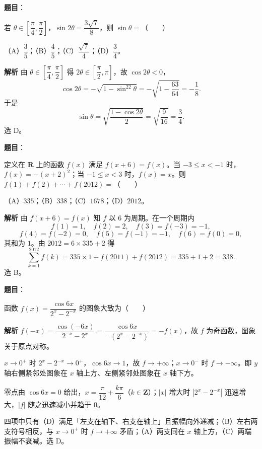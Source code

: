 \begin{answer}

\textbf{题目}：

若 $\theta\in\left[\dfrac\pi4,\dfrac\pi2\right]$，$\sin2\theta=\dfrac{3\sqrt7}8$，则 $\sin\theta=$\mbox{（　　）}

（A）$\dfrac35$；（B）$\dfrac45$；（C）$\dfrac{\sqrt7}4$；（D）$\dfrac34$。

\textbf{解析}
由 $\theta\in\left[\dfrac\pi4,\dfrac\pi2\right]$ 得 $2\theta\in\left[\dfrac\pi2,\pi\right]$，故 $\cos2\theta<0$，
\nopagebreak[4]
\[\cos2\theta=-\sqrt{1-\sin^22\theta}=-\sqrt{1-\frac{63}{64}}=-\frac18.\]
于是
\nopagebreak[4]
\[\sin\theta=\sqrt{\frac{1-\cos2\theta}2}=\sqrt{\frac{9}{16}}=\frac34.\]
选 D。


\end{answer}
\begin{answer}

\textbf{题目}：

定义在 $\mathbf R$ 上的函数 $f(x)$ 满足 $f(x+6)=f(x)$。当 $-3\leqslant x<-1$ 时，$f(x)=-(x+2)^2$；当 $-1\leqslant x<3$ 时，$f(x)=x$。则 $f(1)+f(2)+\cdots+f(2012)=$\mbox{（　　）}

（A）$335$；（B）$338$；（C）$1678$；（D）$2012$。

\textbf{解析}
由 $f(x+6)=f(x)$ 知 $f$ 以 $6$ 为周期。在一个周期内
\nopagebreak[4]
\[f(1)=1,\quad f(2)=2,\quad f(3)=f(-3)=-1,\]
\nopagebreak[4]
\[f(4)=f(-2)=0,\quad f(5)=f(-1)=-1,\quad f(6)=f(0)=0,\]
其和为 $1$。由 $2012=6\times335+2$ 得
\nopagebreak[4]
\[\sum_{k=1}^{2012}f(k)=335\times1+f(2011)+f(2012)=335+1+2=338.\]
选 B。


\end{answer}
\begin{answer}

\textbf{题目}：

函数 $f(x)=\dfrac{\cos6x}{2^x-2^{-x}}$ 的图象大致为\mbox{（　　）}
\nopagebreak[4]
\begin{center}\end{center}
\nopagebreak[4]
\textbf{解析}
$f(-x)=\dfrac{\cos(-6x)}{2^{-x}-2^x}=\dfrac{\cos6x}{-(2^x-2^{-x})}=-f(x)$，故 $f$ 为奇函数，图象关于原点对称。

$x\to0^+$ 时 $2^x-2^{-x}\to0^+$，$\cos6x\to1$，故 $f\to+\infty$；$x\to0^-$ 时 $f\to-\infty$。即 $y$ 轴右侧紧邻处图象在 $x$ 轴上方、左侧紧邻处图象在 $x$ 轴下方。

零点由 $\cos6x=0$ 给出，$x=\dfrac\pi{12}+\dfrac{k\pi}6$（$k\in\mathbf Z$）；$|x|$ 增大时 $|2^x-2^{-x}|$ 迅速增大，$|f|$ 随之迅速减小并趋于 $0$。

四项中只有（D）满足「左支在轴下、右支在轴上」且振幅向外递减；（B）左右两支符号相反，与 $x\to0^+$ 时 $f\to+\infty$ 矛盾；（A）两支同在 $x$ 轴上方，（C）两端振幅不衰减。选 D。


\end{answer}

